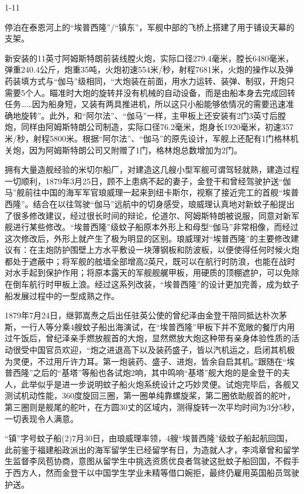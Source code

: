 \documentclass[12pt,UTF8]{ctexbook}
\begin{document}
1-11

停泊在泰恩河上的“埃普西隆”/“镇东”，军舰中部的飞桥上搭建了用于铺设天幕的支架。

新安装的11英寸阿姆斯特朗前装线膛火炮，实际口径279.4毫米，膛长6480毫米，弹重240.4公斤，炮重35吨，火炮初速554米/秒，射程7681米，火炮的操作以及弹药装填方式与“伽马”级相同，“大炮装在前面，用水力运转、装弹、制驭，开炮只需要5个人。瞄准时大炮的旋转并没有机械的自动设备，而是由船本身去完成回转任务……因为船身短，又装有两具推进机，所以这只小船能够依情况的需要迅速准确地旋转”。此外，和“阿尔法”、“伽马”一样，主甲板上还安装有2门3英寸后膛炮，同样由阿姆斯特朗公司制造，实际口径76.2毫米，炮身长1920毫米，初速357米/秒，射程5800米。根据“阿尔法”、“伽马”的原先设计，军舰上还配有1门格林机关炮，因为阿姆斯特朗公司又附赠了1门，格林炮总数增加为2门。

拥有大量造舰经验的米切尔船厂，对建造这几艘小型军舰可谓驾轻就熟，建造过程一切顺利，1879年3月25日，顾不上患病不起的妻子，金登干和曾经驾驶护送“伽马”舰前往中国的海军军官琅威理一起来到纽卡斯尔，视察了接近完工的首舰“埃普西隆”。结合在以往驾驶“伽马”远航中的切身感受，琅威理认真地对新蚊子船提出了很多修改建议，经过很长时间的辩论，伦道尔、阿姆斯特朗被说服，同意对新军舰进行某些修改。“埃普西隆”级蚊子船原本外形上和母型“伽马”非常相像，而经过这次修改后，外形上就产生了极为明显的区别。琅威理对“埃普西隆”的主要修改建议有：在主炮防护围壁上方水平敷设一块薄钢板和防波板，以便使得任何时候火炮都处于遮蔽中；将军舰的舷墙全部增高2英尺，既可以在航行时防浪，也能在战时对水手起到保护作用；将原本露天的军舰舰艉甲板，用硬质的顶棚遮护，可以免除在倒车航行时甲板上浪。经过这系列改装，“埃普西隆”的设计更加完善，成为蚊子船发展过程中的一型成熟之作。

1879年7月24日，继郭嵩焘之后出任驻英公使的曾纪泽由金登干陪同抵达朴次茅斯，一行人等分乘4艘蚊子船出海演试，在“埃普西隆”甲板下并不宽敞的餐厅内用过午饭后，曾纪泽亲手燃放舰首的大炮，显然燃放大炮这种带有亲身体验性质的活动很受中国官员欢迎，“炮之进退高下以及装药盛子，皆以汽机运之，启闭其机极为灵便，不过用斤许力耳。第一炮装药、盛子、进炮，皆余自启其机。”跟随在“埃普西隆”之后的“基塔”等船也各试炮2响，其中鸣响“基塔”舰大炮的是金登干的夫人，此举似乎是进一步说明蚊子船火炮系统设计之巧妙灵便。试炮完毕后，各舰又测试机动性能，360度旋回三圈，第一圈单纯靠螺旋桨，第二圈依助舰首的舵叶，第三圈则是舰尾的舵叶，在方圆30丈的区域内，测得旋转一次平均时间为3分5秒，一切表现令人满意。

“镇”字号蚊子船(2)7月30日，由琅威理率领，4艘“埃普西隆”级蚊子船起航回国，此前鉴于福建船政派出的海军留学生已经留学有日，为造就人才，李鸿章曾和留学生监督李凤苞协商，意图从留学生中挑选资质优良者驾驶这批蚊子船回国，不假手于西方人，然而金登干以中国学生学业未精等借口婉拒，最终仍雇用英国船员驾驶护送。
\end{document}

